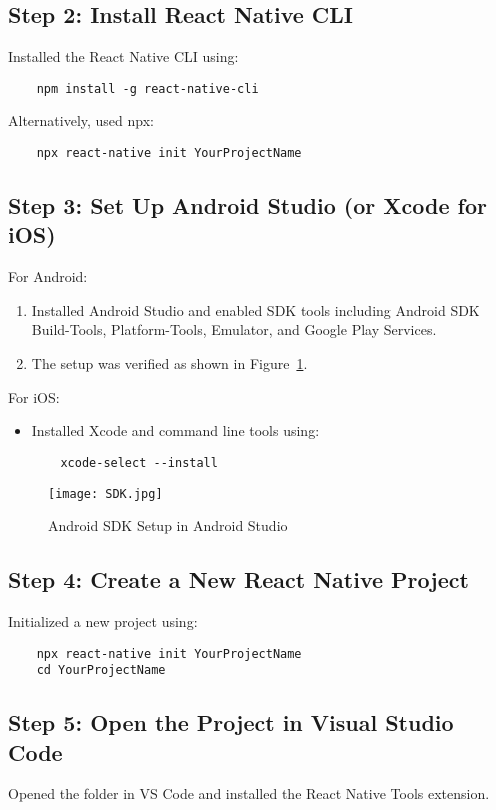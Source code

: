 \documentclass{article}
\begin{document}
\subsection{Step 2: Install React Native CLI}
Installed the React Native CLI using:
\begin{verbatim}
    npm install -g react-native-cli
\end{verbatim}
Alternatively, used npx:
\begin{verbatim}
    npx react-native init YourProjectName
\end{verbatim}

\subsection{Step 3: Set Up Android Studio (or Xcode for iOS)}
For Android:
\begin{enumerate}
    \item Installed Android Studio and enabled SDK tools including Android SDK Build-Tools, Platform-Tools, Emulator, and Google Play Services.
    \item The setup was verified as shown in Figure~\ref{fig:sdk_setup}.
\end{enumerate}
For iOS:
\begin{itemize}
    \item Installed Xcode and command line tools using:
    \begin{verbatim}
    xcode-select --install
    \end{verbatim}
\end{itemize}

\begin{figure}[H]
    \centering
    \texttt{[image: SDK.jpg]}
    \caption{Android SDK Setup in Android Studio}
    \label{fig:sdk_setup}
\end{figure}

\subsection{Step 4: Create a New React Native Project}
Initialized a new project using:
\begin{verbatim}
    npx react-native init YourProjectName
    cd YourProjectName
\end{verbatim}

\subsection{Step 5: Open the Project in Visual Studio Code}
Opened the folder in VS Code and installed the React Native Tools extension.
\end{document}
